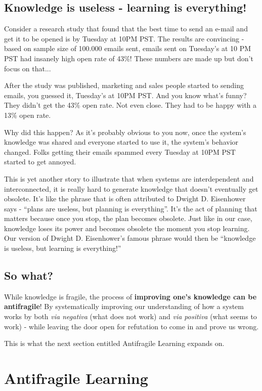 \documentclass{article}
\begin{document}
\subsection{Knowledge is useless - learning is everything!}

Consider a research study that found that the best time to send an e-mail and get it to be opened is by Tuesday at 10PM PST. The results are convincing - based on sample size of 100.000 emails sent, emails sent on Tuesday's at 10 PM PST had insanely high open rate of 43\%! These numbers are made up but don't focus on that...

After the study was published, marketing and sales people started to sending emails, you guessed it, Tuesday's at 10PM PST. And you know what's funny? They didn't get the 43\% open rate. Not even close. They had to be happy with a 13\% open rate. 

Why did this happen? As it's probably obvious to you now, once the system's knowledge was shared and everyone started to use it, the system's behavior changed. Folks getting their emails spammed every Tuesday at 10PM PST started to get annoyed.

This is yet another story to illustrate that when systems are interdependent and interconnected, it is really hard to generate knowledge that doesn't eventually get obsolete. It's like the phrase that is often attributed to Dwight D. Eisenhower says - ``plans are useless, but planning is everything''. It's the act of planning that matters because once you stop, the plan becomes obsolete. Just like in our case, knowledge loses its power and becomes obsolete the moment you stop learning. Our version of Dwight D. Eisenhower's famous phrase would then be ``knowledge is useless, but learning is everything!''

\subsection{So what?}
While knowledge is fragile, the process of \textbf{improving one's knowledge can be antifragile}!
By systematically improving our understanding of how a system works by both \emph{via negativa} (what does not work) and \emph{via positiva} (what seems to work) - while leaving the door open for refutation to come in and prove us wrong.

This is what the next section entitled Antifragile Learning expands on.

\section{Antifragile Learning}
\end{document}
